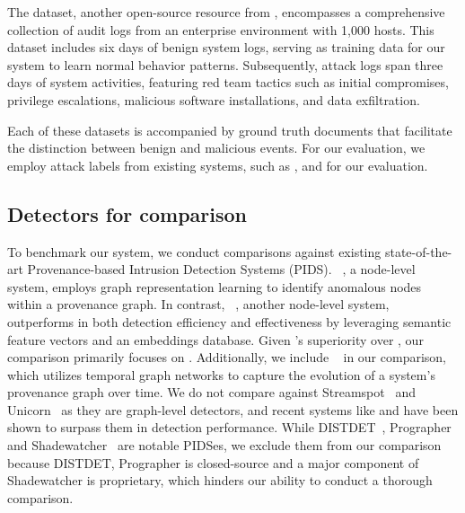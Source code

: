 The \optc dataset, another open-source resource from \darpa, encompasses a comprehensive collection of audit logs from an enterprise environment with 1,000 hosts. This dataset includes six days of benign system logs, serving as training data for our system to learn normal behavior patterns. Subsequently, attack logs span three days of system activities, featuring red team tactics such as initial compromises, privilege escalations, malicious software installations, and data exfiltration.

Each of these datasets is accompanied by ground truth documents that facilitate the distinction between benign and malicious events. For our evaluation, we employ attack labels from existing systems, such as \threatrace, \kairos and \flash for our evaluation.


\subsection{Detectors for comparison}

To benchmark our system, we conduct comparisons against existing state-of-the-art Provenance-based Intrusion Detection Systems (PIDS). \threatrace~\cite{wang2022threatrace}, a node-level system, employs graph representation learning to identify anomalous nodes within a provenance graph. In contrast, \flash~\cite{flash2024}, another node-level system, outperforms \threatrace in both detection efficiency and effectiveness by leveraging semantic feature vectors and an embeddings database. Given \flash's superiority over \threatrace, our comparison primarily focuses on \flash. Additionally, we include \kairos~\cite{cheng2023kairos} in our comparison, which utilizes temporal graph networks to capture the evolution of a system's provenance graph over time. We do not compare against Streamspot~\cite{streamspot} and Unicorn~\cite{han2020unicorn} as they are graph-level detectors, and recent systems like \threatrace and \flash have been shown to surpass them in detection performance. While DISTDET~\cite{dong2023distdet}, Prographer~\cite{yangprographer} and Shadewatcher~\cite{shadewatcher} are notable PIDSes, we exclude them from our comparison because DISTDET, Prographer is closed-source and a major component of Shadewatcher is proprietary, which hinders our ability to conduct a thorough comparison.

